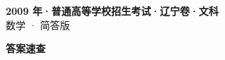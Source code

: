 \documentclass[zihao=-4, a4paper]{ctexart}
\begin{document}
\begin{center}
  {\Large\bfseries 2009 年·普通高等学校招生考试·辽宁卷·文科}\\[4pt]
  {\large 数学 · 简答版}
\end{center}
\medskip
{}

\clearpage
{}
\begin{center}{\Large\bfseries 答案速查}\end{center}
\medskip

\end{document}
